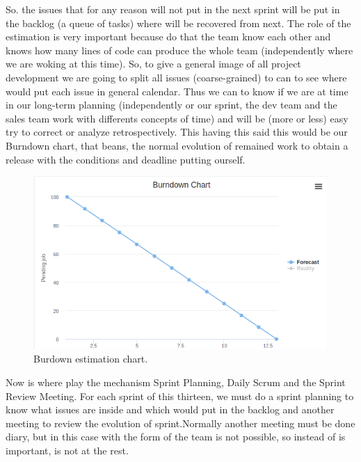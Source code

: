 So. the issues that for any reason will not put in the next sprint will be put
in the backlog (a queue of tasks) where will be recovered from next.
The role of the estimation is very important because do that the team know each
other and knows how many lines of code can produce the whole team (independently
where we are woking at this time).
\intro
So, to give a general image of all project development we are going to split all
issues (coarse-grained) to can to see where would put each issue in general calendar.
Thus we can to know if we are at time in our long-term planning (independently or
our sprint, the dev team and the sales team work with differents concepts of time)
and will be (more or less) easy try to correct or analyze retrospectively.
\intro
This having this said this would be our Burndown chart, that beans, the normal
evolution of remained work to obtain a release with the conditions and deadline
putting ourself.

\begin{figure}[H]
  \includegraphics[scale=0.4]{img/graphics/burndown.png}
  \centering
  \caption{Burdown estimation chart.}
\end{figure}

\noindent Now is where play the mechanism Sprint Planning, Daily Scrum and the Sprint
Review Meeting. For each sprint of this thirteen, we must do a sprint planning
to know what issues are inside and which would put in the backlog and another
meeting to review the evolution of sprint.Normally another meeting must be done
diary, but in this case with the form of the team is not possible, so instead of is important, is not at the rest.
